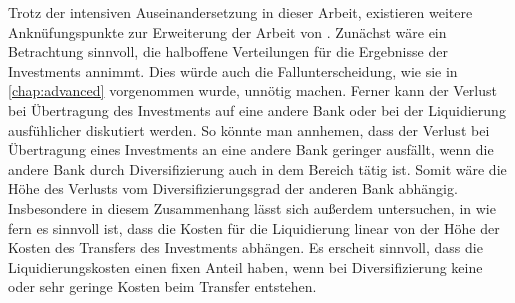 Trotz der intensiven Auseinandersetzung in dieser Arbeit, existieren weitere Anknüfungspunkte zur Erweiterung der Arbeit von \citeauthor{Wagner-2010}. Zunächst wäre ein Betrachtung sinnvoll, die halboffene Verteilungen für die Ergebnisse der Investments annimmt. Dies würde auch die Fallunterscheidung, wie sie in \cref{chap:advanced} vorgenommen wurde, unnötig machen. Ferner kann der Verlust bei Übertragung des Investments auf eine andere Bank oder bei der Liquidierung ausfühlicher diskutiert werden. So könnte man annhemen, dass der Verlust bei Übertragung eines Investments an eine andere Bank geringer ausfällt, wenn die andere Bank durch Diversifizierung auch in dem Bereich tätig ist. Somit wäre die Höhe des Verlusts vom Diversifizierungsgrad der anderen Bank abhängig. Insbesondere in diesem Zusammenhang lässt sich außerdem untersuchen, in wie fern es sinnvoll ist, dass die Kosten für die Liquidierung linear von der Höhe der Kosten des Transfers des Investments abhängen. Es erscheit \zb{} sinnvoll, dass die Liquidierungskosten einen fixen Anteil haben, wenn bei Diversifizierung keine oder sehr geringe Kosten beim Transfer entstehen.